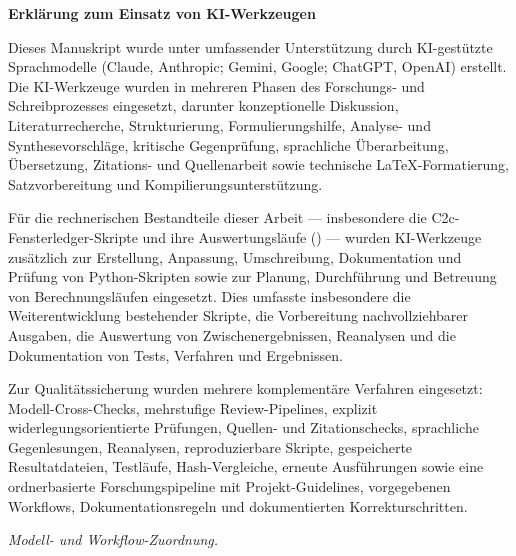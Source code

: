 \documentclass[12pt,a4paper]{article}
\theoremstyle{definition}
\theoremstyle{remark}
\begin{document}
\noindent\textbf{Erklärung zum Einsatz von KI-Werkzeugen}

\smallskip
\small

\begin{sloppypar}
\noindent
Dieses Manuskript wurde unter umfassender Unterstützung durch KI-gestützte
Sprachmodelle (Claude, Anthropic; Gemini, Google; ChatGPT, OpenAI) erstellt.
Die KI-Werkzeuge wurden in mehreren Phasen des Forschungs- und
Schreibprozesses eingesetzt, darunter konzeptionelle Diskussion,
Literaturrecherche, Strukturierung, Formulierungshilfe, Analyse- und
Synthesevorschläge, kritische Gegenprüfung, sprachliche Überarbeitung,
Übersetzung, Zitations- und Quellenarbeit sowie technische
\LaTeX-Formatierung, Satzvorbereitung und Kompilierungsunterstützung.
\end{sloppypar}

\medskip

\noindent
Für die rechnerischen Bestandteile dieser Arbeit --- insbesondere die
C2c-Fensterledger-Skripte und ihre Auswertungsläufe
() --- wurden KI-Werkzeuge zusätzlich zur
Erstellung, Anpassung, Umschreibung, Dokumentation und Prüfung von
Python-Skripten sowie zur Planung, Durchführung und Betreuung von
Berechnungsläufen eingesetzt. Dies umfasste insbesondere die
Weiterentwicklung bestehender Skripte, die Vorbereitung nachvollziehbarer
Ausgaben, die Auswertung von Zwischenergebnissen, Reanalysen und die
Dokumentation von Tests, Verfahren und Ergebnissen.

\medskip

\noindent
Zur Qualitätssicherung wurden mehrere komplementäre Verfahren eingesetzt:
Modell-Cross-Checks, mehrstufige Review-Pipelines, explizit
widerlegungsorientierte Prüfungen, Quellen- und Zitationschecks,
sprachliche Gegenlesungen, Reanalysen, reproduzierbare Skripte, gespeicherte
Resultatdateien, Testläufe, Hash-Vergleiche, erneute Ausführungen sowie eine
ordnerbasierte Forschungspipeline mit Projekt-Guidelines, vorgegebenen
Workflows, Dokumentationsregeln und dokumentierten Korrekturschritten.

\medskip

\noindent\textit{Modell- und Workflow-Zuordnung.}

\medskip
\end{document}
